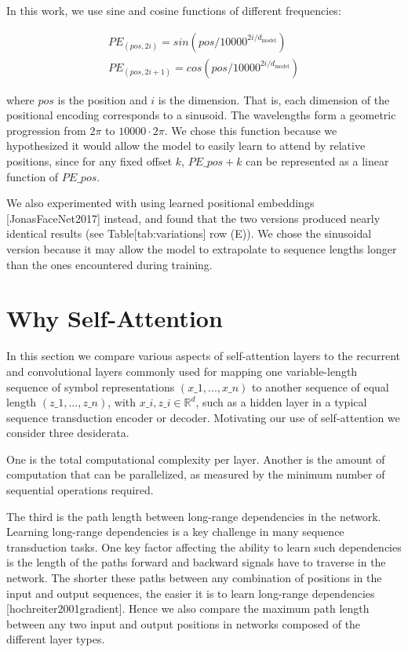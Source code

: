 \documentclass[11pt,a4paper]{article}
\begin{document}
In this work, we use sine and cosine functions of different frequencies:

$$\begin{align*}
    PE_{(pos,2i)} = sin(pos / 10000^{2i/d_{\text{model}}}) \\
    PE_{(pos,2i+1)} = cos(pos / 10000^{2i/d_{\text{model}}})
\end{align*}$$

where $pos$ is the position and $i$ is the dimension.  That is, each dimension of the positional encoding corresponds to a sinusoid.  The wavelengths form a geometric progression from $2\pi$ to $10000 \cdot 2\pi$.  We chose this function because we hypothesized it would allow the model to easily learn to attend by relative positions, since for any fixed offset $k$, $PE\_{pos+k}$ can be represented as a linear function of $PE\_{pos}$.

We also experimented with using learned positional embeddings [JonasFaceNet2017] instead, and found that the two versions produced nearly identical results (see Table[tab:variations] row (E)).  We chose the sinusoidal version because it may allow the model to extrapolate to sequence lengths longer than the ones encountered during training.

\section{Why Self-Attention}

In this section we compare various aspects of self-attention layers to the recurrent and convolutional layers commonly used for mapping one variable-length sequence of symbol representations $(x\_1, ..., x\_n)$ to another sequence of equal length $(z\_1, ..., z\_n)$, with $x\_i, z\_i \in \mathbb{R}^d$, such as a hidden layer in a typical sequence transduction encoder or decoder. Motivating our use of self-attention we consider three desiderata.

One is the total computational complexity per layer.
Another is the amount of computation that can be parallelized, as measured by the minimum number of sequential operations required.

The third is the path length between long-range dependencies in the network. Learning long-range dependencies is a key challenge in many sequence transduction tasks. One key factor affecting the ability to learn such dependencies is the length of the paths forward and backward signals have to traverse in the network. The shorter these paths between any combination of positions in the input and output sequences, the easier it is to learn long-range dependencies [hochreiter2001gradient]. Hence we also compare the maximum path length between any two input and output positions in networks composed of the different layer types.
\end{document}
